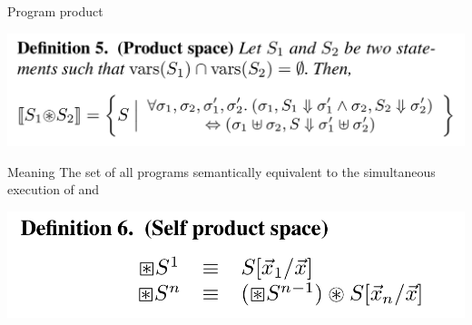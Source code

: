 \documentclass[page number]{beamer}
\begin{document}
\begin{frame}{Program product}
  \begin{center}
    \includegraphics[scale=0.2]{img_sousa/def5.png}
  \end{center}
  \vfill
  \begin{exampleblock}{Meaning}
    The set of all programs semantically equivalent to the simultaneous execution of  and 
  \end{exampleblock}
  \vfill
  \begin{center}
    \includegraphics[scale=0.2]{img_sousa/def6.png}
  \end{center}
  
\end{frame}
\end{document}
